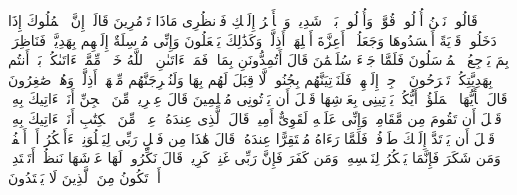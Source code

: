 \stopbuffer%
\startbuffer[\q:27:33]
قَالُوا۟ نَحۡنُ أُو۟لُوا۟ قُوَّةࣲ وَأُو۟لُوا۟ بَأۡسࣲ شَدِیدࣲ وَٱلۡأَمۡرُ إِلَیۡكِ فَٱنظُرِی مَاذَا تَأۡمُرِینَ%
\stopbuffer%
\startbuffer[\q:27:34]
قَالَتۡ إِنَّ ٱلۡمُلُوكَ إِذَا دَخَلُوا۟ قَرۡیَةً أَفۡسَدُوهَا وَجَعَلُوۤا۟ أَعِزَّةَ أَهۡلِهَاۤ أَذِلَّةࣰۚ وَكَذَٰلِكَ یَفۡعَلُونَ%
\stopbuffer%
\startbuffer[\q:27:35]
وَإِنِّی مُرۡسِلَةٌ إِلَیۡهِم بِهَدِیَّةࣲ فَنَاظِرَةُۢ بِمَ یَرۡجِعُ ٱلۡمُرۡسَلُونَ%
\stopbuffer%
\startbuffer[\q:27:36]
فَلَمَّا جَاۤءَ سُلَیۡمَٰنَ قَالَ أَتُمِدُّونَنِ بِمَالࣲ فَمَاۤ ءَاتَىٰنِۦَ ٱللَّهُ خَیۡرࣱ مِّمَّاۤ ءَاتَىٰكُمۚ بَلۡ أَنتُم بِهَدِیَّتِكُمۡ تَفۡرَحُونَ%
\stopbuffer%
\startbuffer[\q:27:37]
ٱرۡجِعۡ إِلَیۡهِمۡ فَلَنَأۡتِیَنَّهُم بِجُنُودࣲ لَّا قِبَلَ لَهُم بِهَا وَلَنُخۡرِجَنَّهُم مِّنۡهَاۤ أَذِلَّةࣰ وَهُمۡ صَٰغِرُونَ%
\stopbuffer%
\startbuffer[\q:27:38]
قَالَ یَٰۤأَیُّهَا ٱلۡمَلَؤُا۟ أَیُّكُمۡ یَأۡتِینِی بِعَرۡشِهَا قَبۡلَ أَن یَأۡتُونِی مُسۡلِمِینَ%
\stopbuffer%
\startbuffer[\q:27:39]
قَالَ عِفۡرِیتࣱ مِّنَ ٱلۡجِنِّ أَنَا۠ ءَاتِیكَ بِهِۦ قَبۡلَ أَن تَقُومَ مِن مَّقَامِكَۖ وَإِنِّی عَلَیۡهِ لَقَوِیٌّ أَمِینࣱ%
\stopbuffer%
\startbuffer[\q:27:40]
قَالَ ٱلَّذِی عِندَهُۥ عِلۡمࣱ مِّنَ ٱلۡكِتَٰبِ أَنَا۠ ءَاتِیكَ بِهِۦ قَبۡلَ أَن یَرۡتَدَّ إِلَیۡكَ طَرۡفُكَۚ فَلَمَّا رَءَاهُ مُسۡتَقِرًّا عِندَهُۥ قَالَ هَٰذَا مِن فَضۡلِ رَبِّی لِیَبۡلُوَنِیۤ ءَأَشۡكُرُ أَمۡ أَكۡفُرُۖ وَمَن شَكَرَ فَإِنَّمَا یَشۡكُرُ لِنَفۡسِهِۦۖ وَمَن كَفَرَ فَإِنَّ رَبِّی غَنِیࣱّ كَرِیمࣱ%
\stopbuffer%
\startbuffer[\q:27:41]
قَالَ نَكِّرُوا۟ لَهَا عَرۡشَهَا نَنظُرۡ أَتَهۡتَدِیۤ أَمۡ تَكُونُ مِنَ ٱلَّذِینَ لَا یَهۡتَدُونَ%
\stopbuffer%
